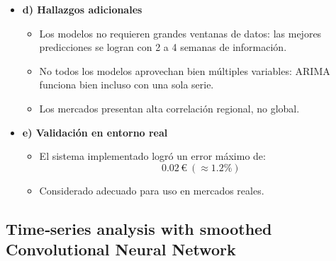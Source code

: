 \begin{itemize}
		\item \textbf{d) Hallazgos adicionales}
		\begin{itemize}
			\item Los modelos no requieren grandes ventanas de datos: las mejores predicciones se logran con 2 a 4 semanas de información.
			\item No todos los modelos aprovechan bien múltiples variables: ARIMA funciona bien incluso con una sola serie.
			\item Los mercados presentan alta correlación regional, no global.
		\end{itemize}

		\item \textbf{e) Validación en entorno real}
		\begin{itemize}
			\item El sistema implementado logró un error máximo de:
			\[
			0.02 \,€ \ (\approx 1.2\%)
			\]
			\item Considerado adecuado para uso en mercados reales.
		\end{itemize}

	\end{itemize}




\subsection{Time‑series analysis with smoothed Convolutional Neural Network}

